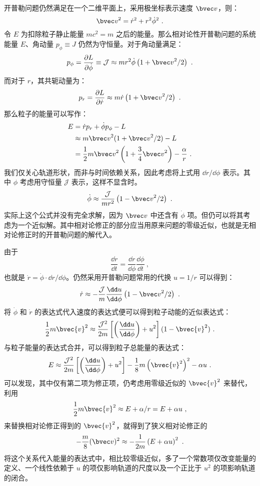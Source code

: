 开普勒问题仍然满足在一个二维平面上，采用极坐标表示速度 $\bvec v$，则：
$${\bvec v}^2 = \dot r^2 + r^2 \dot \phi^2 ~.$$
令 $E$ 为扣除粒子静止能量 $mc^2 = m$ 之后的能量。那么相对论性开普勒问题的系统能量 $E$、角动量 $p_\phi \equiv J$ 仍然为守恒量。对于角动量满足：
$$p_\phi = \frac{\partial L}{\partial {\dot \phi}} \equiv \mathcal J \approx mr^2 \dot \phi \left( 1+ {\bvec v}^2/2 \right)~.$$
而对于 $r$，其共轭动量为：
$$p_r = \frac{\partial L}{\partial {\dot r}} \approx m \dot r \left( 1 + {\bvec v}^2/2 \right)~.$$
那么粒子的能量可以写作：
\begin{equation}
\begin{aligned}
E &= \dot r p_r + \dot \phi p_\phi - L \\
&\approx m {\bvec v}^2(1+{\bvec v}^2/2)-L \\
&= \frac{1}{2} m {\bvec v}^2 \left( 1 + \frac{3}{4} {\bvec v}^2 \right) - \frac{\alpha}{r} ~.
\end{aligned}
\end{equation}
我们仅关心轨道形状，而非与时间依赖关系，因此考虑将上式用 $\dd{r}/\dd{\phi}$ 表示。其中 $\phi$ 考虑用守恒量 $\mathcal J$ 表示，这样不显含时。
$$\dot \phi \approx \frac{\mathcal J}{mr^2} \left( 1-{\bvec v}^2/2 \right) ~.$$
实际上这个公式并没有完全求解，因为 $\bvec v$ 中还含有 $\dot \phi$ 项。但仍可以将其考虑为一个近似解。其中相对论修正的部分应当用原来问题的零级近似，也就是无相对论修正时的开普勒问题的解代入。

由于
$$\frac{\dd r}{\dd t} = \frac{\dd r}{\dd \phi} \frac{\dd \phi} {\dd t}~,$$
也就是 $\dot r = \dot \phi \cdot \dd{r}/\dd{\phi}$。仍然采用开普勒问题常用的代换 $u = 1/r$ 可以得到：
\begin{equation}
\dot r \approx - \frac{\mathcal J}{m} \frac{\dd u}{\dd \phi} \left(1-{\bvec v}^2/2\right)
~.\end{equation}
将 $\dot \phi$ 和 $\dot r$ 的表达式代入速度的表达式便可以得到粒子动能的近似表达式：
\begin{equation}
\frac{1}{2} m \bvec{v}^2 \approx \frac{\mathcal J^2}{2m} \left[\left(\frac{\dd u}{\dd \phi}\right) + u^2\right] (1-\bvec{v}^2)~.
\end{equation}
与粒子能量的表达式合并，可以得到粒子总能量的表达式：
\begin{equation}
E \approx \frac{\mathcal J^2}{2 m} \left[ \left(\frac{\dd u}{\dd \phi}\right) + u^2 \right] - \frac{1}{8} m \left(\bvec{v}^2\right)^2 -\alpha u ~.
\end{equation}
可以发现，其中仅有第二项为修正项，仍考虑用零级近似的 $\bvec{v}^2$ 来替代，利用
$$\frac{1}{2} m \bvec{v}^2 \approx E + \alpha / r = E + \alpha u ~,$$
来替换相对论修正得到的 $\bvec{v}^2$，就得到了狭义相对论修正的
\begin{equation}
-\frac{m}{8} (\bvec v)^2 \approx - \frac{1}{2m} \left(E + \alpha u\right)^2 ~.
\end{equation}
将这个关系代入能量的表达式中，相比较零级近似，多了一个常数项仅改变能量的定义、一个线性依赖于 $u$ 的项仅影响轨道的尺度以及一个正比于 $u^2$ 的项影响轨道的闭合。


